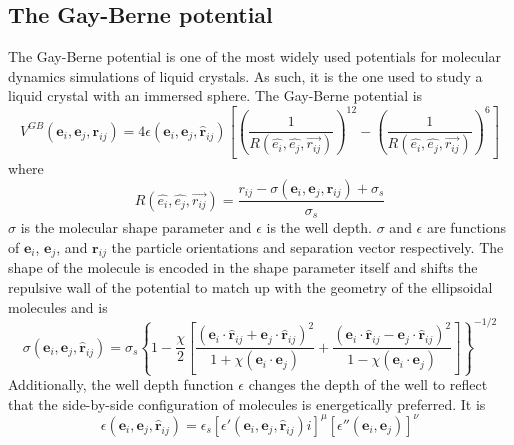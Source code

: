 \documentclass[preprint, aps]{revtex4-1}
\begin{document}
\subsection*{The Gay-Berne potential}
The Gay-Berne potential is one of the most widely used potentials for molecular 
dynamics simulations of liquid crystals. As such, it is the one used to study a
liquid crystal with an immersed sphere. The Gay-Berne potential is
	\begin{equation} \label{gay-berne}
		V^{GB}(\mathbf{e}_i,\mathbf{e}_j,\mathbf{r}_{ij})
			= 4\epsilon (\mathbf{e}_i,\mathbf{e}_j,\mathbf{\hat{r}}_{ij}) 
			\left[
				\left(\frac{1}{R(\hat{e_i},\hat{e_j},\vec{r_{ij}})}\right)^{12}
				- 
				\left(\frac{1}{R(\hat{e_i},\hat{e_j},\vec{r_{ij}})}\right)^{6}
			\right]
	\end{equation}
where
	\begin{equation} \label{distance-term}
		R(\hat{e_i},\hat{e_j},\vec{r_{ij}}) = \frac{
			r_{ij} - \sigma(\mathbf{e}_i,\mathbf{e}_j,\mathbf{\hat{r}}_{ij})
			+ \sigma_s
		}
		{
			\sigma_s
		}
	\end{equation}
$\sigma$ is the molecular shape parameter and $\epsilon$ is the well depth. 
$\sigma$ and $\epsilon$ are functions of $\mathbf{e}_i$,  $\mathbf{e}_j$, and 
$\mathbf{r}_{ij}$ the particle orientations and separation vector respectively. 
The shape of the molecule is encoded in the shape parameter itself and shifts 
the repulsive wall of the potential to match up with the geometry of the
ellipsoidal molecules and is
	\begin{equation} \label{distance-function}
		\sigma(\mathbf{e}_i,\mathbf{e}_j,\mathbf{\hat{r}}_{ij})
		= \sigma_s \left\{
			1 
			- \frac{\chi}{2} \left[
				\frac{
					(\mathbf{e}_i \cdot \mathbf{\hat{r}}_{ij} 
					+ \mathbf{e}_j \cdot \mathbf{\hat{r}}_{ij})^2
				}
				{
					1 + \chi(\mathbf{e}_i\cdot\mathbf{e}_j)
				}
				+\frac{
					(\mathbf{e}_i \cdot \mathbf{\hat{r}}_{ij} 
					- \mathbf{e}_j \cdot \mathbf{\hat{r}}_{ij})^2
				}
				{
					1 - \chi(\mathbf{e}_i \cdot \mathbf{e}_j)
				}
		\right]\right\}^{-1/2}
	\end{equation}
Additionally, the well depth function $\epsilon$ changes the depth of the well 
to reflect that the side-by-side configuration of molecules is energetically 
preferred. It is 
	\begin{equation} \label{orientation-function}
		\epsilon(\mathbf{e}_i,\mathbf{e}_j,\mathbf{\hat{r}}_{ij}) 
		= \epsilon_s
			\left[	
				\epsilon'(\mathbf{e}_i,\mathbf{e}_j,\mathbf{\hat{r}}_{ij})i
			\right]^\mu
			\left[
				\epsilon''(\mathbf{e}_i,\mathbf{e}_j)
			\right]^\nu
	\end{equation}
\end{document}
